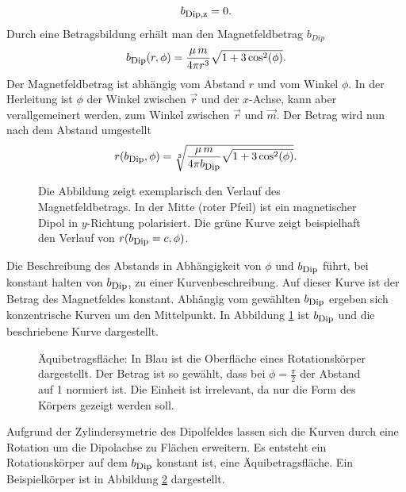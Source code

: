 \begin{equation}
    b_{\textrm{\footnotesize{Dip,z}}} = 0.
\end{equation}
Durch eine Betragsbildung erhält man den Magnetfeldbetrag $b_{Dip}$
\begin{equation}
    b_{\textrm{\footnotesize{Dip}}}(r,\phi) = \frac{\mu\,m}{4\pi r^3} \sqrt{1+3\cos^2(\phi)}.
    \label{eq:BetragErgebnis}
\end{equation}
Der Magnetfeldbetrag ist abhängig vom Abstand $r$ und vom Winkel $\phi$. In der Herleitung ist $\phi$ der Winkel zwischen $\vec{r}$ und der $x$-Achse, kann aber verallgemeinert werden, zum Winkel zwischen $\vec{r}$ und $\vec{m}$. Der Betrag wird nun nach dem Abstand umgestellt
\begin{equation}
    r(b_{\textrm{\footnotesize{Dip}}},\phi) = \sqrt[3]{\frac{\mu\,m}{4\pi b_{\textrm{\footnotesize{Dip}}}}\sqrt{1+3\cos^2(\phi)}}.
    \label{eq:rvonb}
\end{equation}
\begin{figure}[!htb] 
    \centering 
         \caption{Die Abbildung zeigt exemplarisch den Verlauf des Magnetfeldbetrags. In der Mitte (roter Pfeil) ist ein magnetischer Dipol in $y$-Richtung polarisiert. Die grüne Kurve zeigt beispielhaft den Verlauf von $r(b_{\textrm{\footnotesize{Dip}}}=c,\phi)$.}
         \label{fig:BetragMagfield}
 \end{figure}
Die Beschreibung des Abstands in Abhängigkeit von $\phi$ und $b_{\textrm{\footnotesize{Dip}}}$ führt, bei konstant halten von $b_{\textrm{\footnotesize{Dip}}}$, zu einer Kurvenbeschreibung. Auf dieser Kurve ist der Betrag des Magnetfeldes konstant. Abhängig vom gewählten $b_{\textrm{\footnotesize{Dip}}}$ ergeben sich konzentrische Kurven um den Mittelpunkt. In Abbildung \ref{fig:BetragMagfield} ist $b_{\textrm{\footnotesize{Dip}}}$ und die beschriebene Kurve dargestellt.
\begin{figure}[!htb]
    \centering
    \caption{Äquibetragsfläche: In Blau ist die Oberfläche eines Rotationskörper dargestellt. Der Betrag ist so gewählt, dass bei $\phi = \frac{\pi}{2}$ der Abstand auf 1 normiert ist. Die Einheit ist irrelevant, da nur die Form des Körpers gezeigt werden soll.}
    \label{fig:Aequibetragsflaeche}
\end{figure}
Aufgrund der Zylindersymetrie des Dipolfeldes lassen sich die Kurven durch eine Rotation um die Dipolachse zu Flächen erweitern. Es entsteht ein Rotationskörper auf dem $b_{\textrm{\footnotesize{Dip}}}$ konstant ist, eine Äquibetragsfläche. Ein Beispielkörper ist in Abbildung \ref{fig:Aequibetragsflaeche} dargestellt.

